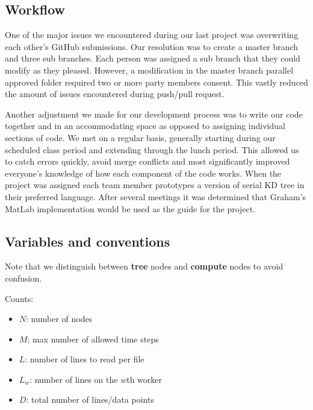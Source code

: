 \documentclass{article}
\begin{document}
\subsection{Workflow}
One of the major issues we encountered during our last project was overwriting each other’s GitHub submissions. Our resolution was to create a master branch and three sub branches. Each person was assigned a sub branch that they could modify as they pleased. However, a modification in the master branch parallel approved folder required two or more party members consent. This vastly reduced the amount of issues encountered during push/pull request.

Another adjustment we made for our development process was to write our code together and in an accommodating space as opposed to assigning individual sections of code. We met on a regular basis, generally starting during our scheduled class period and extending through the lunch period. This allowed us to catch errors quickly, avoid merge conflicts and most significantly improved everyone's knowledge of how each component of the code works. 
When the project was assigned each team member prototypes a version of serial KD tree in their preferred language. After several meetings it was determined that Graham’s MatLab implementation would be used as the guide for the project. 

\subsection{Variables and conventions}
Note that we distinguish between \textbf{tree} nodes and \textbf{compute} nodes to avoid confusion.

\begin{mdframed}[backgroundcolor=blue!20]
	Counts:
	\setlength\itemsep{0.1pt}
	\setlength\parskip{0.1pt}
	\begin{itemize}
		\setlength\itemsep{0.1pt}
		\setlength\parskip{0.1pt}
		\item $N$: number of nodes
		\item $M$: max number of allowed time steps
		\item $L$: number of lines to read per file
		\item $L_w$: number of lines on the $w$th worker
		\item $D$: total number of lines/data points
	\end{itemize}
\end{mdframed}
\end{document}
